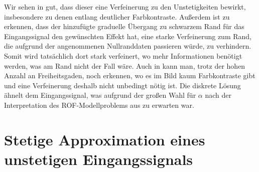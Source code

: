 Wir sehen in  gut, dass dieser eine Verfeinerung zu
den Unstetigkeiten bewirkt, insbesondere zu denen entlang deutlicher
Farbkontraste.
Außerdem ist zu erkennen, dass der hinzufügte graduelle Übergang zu schwarzem
Rand für das Eingangssignal den gewünschten Effekt hat, eine starke
Verfeinerung zum Rand, die aufgrund der angenommenen Nullranddaten passieren
würde, zu verhindern.
Somit wird tatsächlich dort stark verfeinert, wo mehr Informationen benötigt
werden, was am Rand nicht der Fall wäre.
Auch in  kann man, trotz der hohen Anzahl an
Freiheitsgaden, noch erkennen, wo es im Bild kaum Farbkontraste gibt und eine
Verfeinerung deshalb nicht unbedingt nötig ist.
Die diskrete Lösung ähnelt dem Eingangssignal, was aufgrund der großen Wahl für
$\alpha$ nach der Interpretation des ROF-Modellproblems aus
 zu erwarten war.


\section{Stetige Approximation eines unstetigen Eingangssignals}

